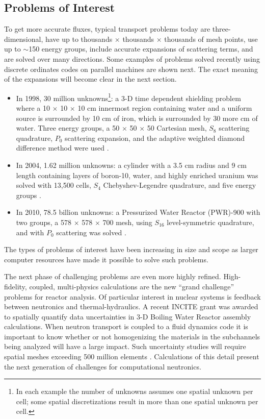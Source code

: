 \subsection{Problems of Interest}
To get more accurate fluxes, typical transport problems today are three-dimensional, have up to thousands $\times$ thousands $\times$ thousands of mesh points, use up to $\sim$150 energy groups, include accurate expansions of scattering terms, and are solved over many directions. Some examples of problems solved recently using discrete ordinates codes on parallel machines are shown next. The exact meaning of the expansions will become clear in the next section.
\begin{itemize}
  \item In 1998, 30 million unknowns\footnote{In each example the number of unknowns assumes one spatial unknown per cell; some spatial discretizations result in more than one spatial unknown per cell.}: a 3-D time dependent shielding problem where a 10 $\times$ 10 $\times$ 10 cm innermost region containing water and a uniform source is surrounded by 10 cm of iron, which is surrounded by 30 more cm of water. Three energy groups, a 50 $\times$ 50 $\times$ 50 Cartesian mesh, $S_{8}$ scattering quadrature, $P_{0}$ scattering expansion, and the adaptive weighted diamond difference method were used \cite{Alcouffe1998}.
  \item In 2004, 1.62 million unknowns: a cylinder with a 3.5 cm radius and 9 cm length containing layers of boron-10, water, and highly enriched uranium was solved with 13,500 cells, $S_{4}$ Chebyshev-Legendre quadrature, and five energy groups \cite{Warsa2004a}. 
  \item In 2010, 78.5 billion unknowns: a Pressurized Water Reactor (PWR)-900 with two groups, a 578 $\times$ 578 $\times$ 700 mesh, using $S_{16}$ level-symmetric quadrature, and with $P_{0}$ scattering was solved \cite{Davidson2010}. 
\end{itemize}
%
The types of problems of interest have been increasing in size and scope as larger computer resources have made it possible to solve such problems. 

The next phase of challenging problems are even more highly refined. High-fidelity, coupled, multi-physics calculations are the new ``grand challenge'' problems for reactor analysis. Of particular interest in nuclear systems is feedback between neutronics and thermal-hydraulics. A recent INCITE grant was awarded to spatially quantify data uncertainties in 3-D Boiling Water Reactor assembly calculations. When neutron transport is coupled to a fluid dynamics code it is important to know whether or not homogenizing the materials in the subchannels being analyzed will have a large impact. Such uncertainty studies will require spatial meshes exceeding 500 million elements \cite{Evans2009a}. Calculations of this detail present the next generation of challenges for computational neutronics. 


